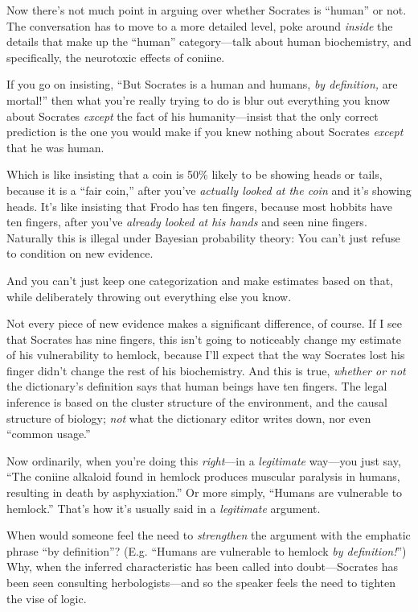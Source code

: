 {
 Now there's not much point in arguing over whether
Socrates is ``human'' or not. The
conversation has to move to a more detailed level, poke around
\textit{inside} the details that make up the
``human'' category---talk about
human biochemistry, and specifically, the neurotoxic effects of
coniine.}

{
 If you go on insisting, ``But Socrates is a human
and humans, \textit{by definition,} are mortal!''
then what you're really trying to do is blur out
everything you know about Socrates \textit{except} the fact of his
humanity---insist that the only correct prediction is the one you would
make if you knew nothing about Socrates \textit{except} that he was
human.}

{
 Which is like insisting that a coin is 50\% likely to be showing
heads or tails, because it is a ``fair
coin,'' after you've \textit{actually
looked at the coin} and it's showing heads.
It's like insisting that Frodo has ten fingers, because
most hobbits have ten fingers, after you've
\textit{already looked at his hands} and seen nine fingers. Naturally
this is illegal under Bayesian probability theory: You
can't just refuse to condition on new evidence.}

{
 And you can't just keep one categorization and
make estimates based on that, while deliberately throwing out
everything else you know.}

{
 Not every piece of new evidence makes a significant difference, of
course. If I see that Socrates has nine fingers, this
isn't going to noticeably change my estimate of his
vulnerability to hemlock, because I'll expect that the
way Socrates lost his finger didn't change the rest of
his biochemistry. And this is true, \textit{whether or not} the
dictionary's definition says that human beings have ten
fingers. The legal inference is based on the cluster structure of the
environment, and the causal structure of biology; \textit{not} what the
dictionary editor writes down, nor even ``common
usage.''}

{
 Now ordinarily, when you're doing this
\textit{right}{}---in a \textit{legitimate} way---you just say,
``The coniine alkaloid found in hemlock produces
muscular paralysis in humans, resulting in death by
asphyxiation.'' Or more simply,
``Humans are vulnerable to
hemlock.'' That's how
it's usually said in a \textit{legitimate} argument.}

{
 When would someone feel the need to \textit{strengthen} the
argument with the emphatic phrase ``by
definition''? (E.g. ``Humans are
vulnerable to hemlock \textit{by definition!}'') Why,
when the inferred characteristic has been called into doubt---Socrates
has been seen consulting herbologists---and so the speaker feels the
need to tighten the vise of logic.}

